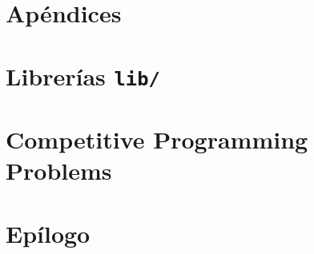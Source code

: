 \documentclass{lispy-book}
\begin{document}
\part{Apéndices}
\label{part:appendices}










\part{Librerías \texttt{lib/}}
\label{part:libs}



\part{Competitive Programming Problems}
\label{part:cpproblems}



\part{Epílogo}
\label{part:epilogue}



\backmatter

\printindex
\end{document}
